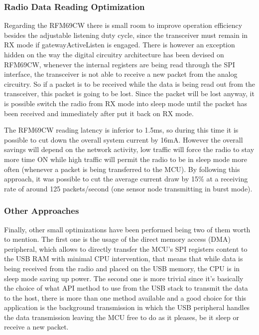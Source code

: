 \documentclass[12pt]{article}
\begin{document}
\subsubsection{Radio Data Reading Optimization}
Regarding the RFM69CW there is small room to improve operation efficiency besides the adjustable listening duty cycle, since the transceiver must remain in RX mode if gatewayActiveListen is engaged. There is however an exception hidden on the way the digital circuitry architecture has been devised on RFM69CW, whenever the internal registers are being read through the SPI interface, the transceiver is not able to receive a new packet from the analog circuitry. So if a packet is to be received while the data is being read out from the transceiver, this packet is going to be lost. Since the packet will be lost anyway, it is possible switch the radio from RX mode into sleep mode until the packet has been received and immediately after put it back on RX mode. 

The RFM69CW reading latency is inferior to 1.5ms, so during this time it is possible to cut down the overall system current by 16mA. However the overall savings will depend on the network activity, low traffic will force the radio to stay more time ON while high traffic will permit the radio to be in sleep mode more often (whenever a packet is being transferred to the MCU). By following this approach, it was possible to cut the average current draw by 15\% at a receiving rate of around 125 packets/second (one sensor node transmitting in burst mode).

\subsubsection{Other Approaches}
Finally, other small optimizations have been performed being two of them worth to mention. The first one is the usage of the direct memory access (DMA) peripheral, which allows to directly transfer the MCU's SPI registers content to the USB RAM with minimal CPU intervention, that means that while data is being received from the radio and placed on the USB memory, the CPU is in sleep mode saving up power. The second one is more trivial since it's basically the choice of what API method to use from the USB stack to transmit the data to the host, there is more than one method available and a good choice for this application is the background transmission in which the USB peripheral handles the data transmission leaving the MCU free to do as it pleases, be it sleep or receive a new packet.
\end{document}
